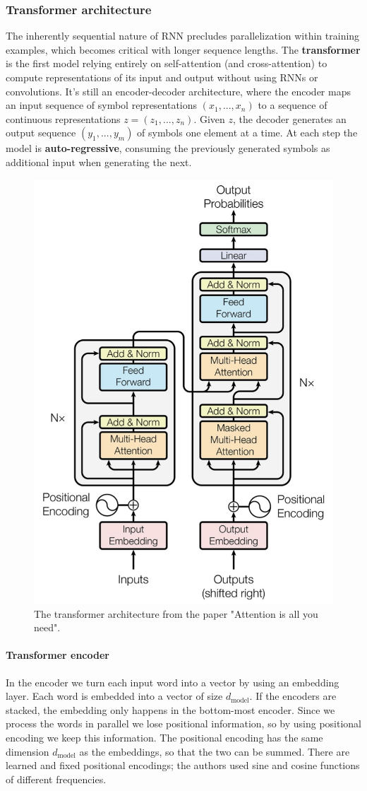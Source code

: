 \subsubsection{Transformer architecture}
The inherently sequential nature of RNN precludes parallelization within training examples, which becomes critical with longer sequence lengths.
The \textbf{transformer} is the first model relying entirely on self-attention (and cross-attention) to compute representations of its input and output without using RNNs or convolutions.
It's still an encoder-decoder architecture, where the encoder maps an input sequence of symbol representations $(x_1, ..., x_n)$ to a sequence of continuous representations $z=(z_1, ..., z_n)$.
Given $z$, the decoder generates an output sequence $(y_1, ..., y_m)$ of symbols one element at a time.
At each step the model is \textbf{auto-regressive}, consuming the previously generated symbols as additional input when generating the next.

\begin{figure}[htbp]
  \centering
  \includegraphics[width=0.6\linewidth]{./img/transformer.jpg}
  \caption{The transformer architecture from the paper "Attention is all you need".}
\end{figure}

\paragraph{Transformer encoder}
In the encoder we turn each input word into a vector by using an embedding layer.
Each word is embedded into a vector of size $d_{\text{model}}$.
If the encoders are stacked, the embedding only happens in the bottom-most encoder.
Since we process the words in parallel we lose positional information, so by using positional encoding we keep this information.
The positional encoding has the same dimension $d_{\text{model}}$ as the embeddings, so that the two can be summed.
There are learned and fixed positional encodings; the authors used sine and cosine functions of different frequencies.

